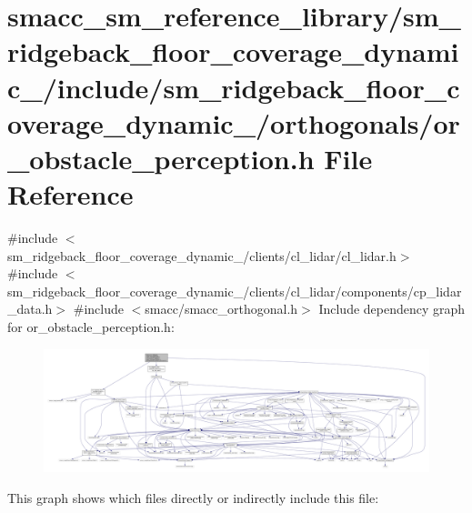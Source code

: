\hypertarget{sm__ridgeback__floor__coverage__dynamic__1_2include_2sm__ridgeback__floor__coverage__dynamic__1_ce252ac0da8474a4e18e78c91c23b65c}{}\section{smacc\+\_\+sm\+\_\+reference\+\_\+library/sm\+\_\+ridgeback\+\_\+floor\+\_\+coverage\+\_\+dynamic\+\_/include/sm\+\_\+ridgeback\+\_\+floor\+\_\+coverage\+\_\+dynamic\+\_/orthogonals/or\+\_\+obstacle\+\_\+perception.h File Reference}
\label{sm__ridgeback__floor__coverage__dynamic__1_2include_2sm__ridgeback__floor__coverage__dynamic__1_ce252ac0da8474a4e18e78c91c23b65c}
{\ttfamily \#include $<$sm\+\_\+ridgeback\+\_\+floor\+\_\+coverage\+\_\+dynamic\+\_/clients/cl\+\_\+lidar/cl\+\_\+lidar.\+h$>$}\newline
{\ttfamily \#include $<$sm\+\_\+ridgeback\+\_\+floor\+\_\+coverage\+\_\+dynamic\+\_/clients/cl\+\_\+lidar/components/cp\+\_\+lidar\+\_\+data.\+h$>$}\newline
{\ttfamily \#include $<$smacc/smacc\+\_\+orthogonal.\+h$>$}\newline
Include dependency graph for or\+\_\+obstacle\+\_\+perception.\+h\+:
\nopagebreak
\begin{figure}[H]
\begin{center}
\leavevmode
\includegraphics[width=350pt]{sm__ridgeback__floor__coverage__dynamic__1_2include_2sm__ridgeback__floor__coverage__dynamic__1_96794d08cc8407f694e5ccdeb72536cf}
\end{center}
\end{figure}
This graph shows which files directly or indirectly include this file\+:
\nopagebreak
